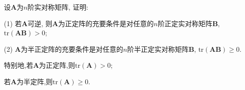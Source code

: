 \documentclass[../../main.tex]{subfiles}
\begin{document}
\begin{proposition}\label{proposition:正定和半正定阵关于迹的判定准则}
设$\boldsymbol{A}$为$n$阶实对称矩阵, 证明:

(1) 若$\boldsymbol{A}$可逆, 则$\boldsymbol{A}$为正定阵的充要条件是对任意的$n$阶正定实对称矩阵$\boldsymbol{B}$, $\text{tr}(\boldsymbol{A}\boldsymbol{B})>0$;

(2) $\boldsymbol{A}$为半正定阵的充要条件是对任意的$n$阶半正定实对称矩阵$\boldsymbol{B}$, $\text{tr}(\boldsymbol{A}\boldsymbol{B})\geq 0$.
\end{proposition}
\begin{remark}
特别地,若$\boldsymbol{A}$为正定阵,则$\text{tr}(\boldsymbol{A})>0$;

若$\boldsymbol{A}$为半定阵,则$\text{tr}(\boldsymbol{A})\geq 0$.
\end{remark}
\end{document}
